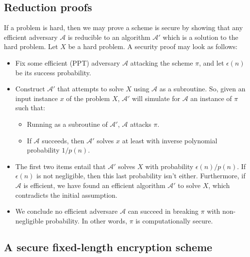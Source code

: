 \documentclass[a4paper, 12pt]{article}
\begin{document}
\subsection{Reduction proofs}

If a problem is hard, then we may prove a scheme is secure by 
showing that any efficient adversary $\mathcal{A}$ is reducible to 
an algorithm $\mathcal{A}'$ which is a solution to the hard 
problem. Let $X$ be a hard problem. A security proof may look as follows: 

\begin{itemize}
    \item Fix some efficient (PPT) adversary $\mathcal{A}$ attacking 
        the scheme $\pi$, and let $\epsilon(n)$ be its 
        success probability.
    \item Construct $\mathcal{A}'$ that attempts to solve 
        $X$ using $\mathcal{A}$ as a subroutine. So, 
        given an input instance $x$ of the problem $X$, $\mathcal{A}'$
        will simulate for $\mathcal{A}$ an instance of $\pi$
        such that: 

        \begin{itemize}
            \item Running as a subroutine of $\mathcal{A}'$, $\mathcal{A}$ attacks $\pi$. 
            \item If $\mathcal{A}$ succeeds, then $\mathcal{A}'$ solves 
                $x$ at least with inverse polynomial probability 
                $1 / p(n)$.
        \end{itemize}
    \item The first two items entail that $\mathcal{A}'$ solves 
        $X$ with probability $\epsilon(n) / p(n)$. If $\epsilon(n)$ 
        is not negligible, then this last probability isn't either. 
        Furthermore, if $\mathcal{A}$ is efficient, we have found an 
        efficient algorithm $\mathcal{A}'$ to solve $X$, which 
        contradicts the initial assumption. 
    \item We conclude no efficient adversare $\mathcal{A}$ can succeed 
        in breaking $\pi$ with non-negligible probability. In 
        other words, $\pi$ is computationally secure.
\end{itemize}


\subsection{A secure fixed-length encryption scheme}
\end{document}
